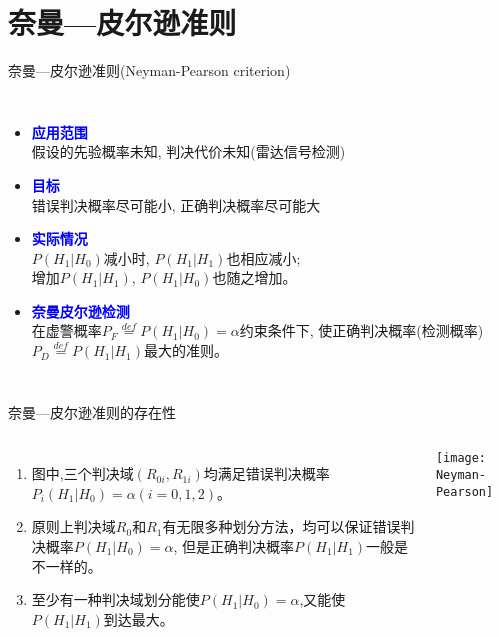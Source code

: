 \section{奈曼---皮尔逊准则}

\begin{frame}[shrink]{奈曼---皮尔逊准则(Neyman-Pearson criterion)}
\begin{columns}
\begin{itemize}
\item \textbf{\textcolor{blue}{应用范围}}\\
假设的先验概率未知, 判决代价未知(雷达信号检测)
\item \textbf{\textcolor{blue}{目标}}\\
错误判决概率尽可能小, 正确判决概率尽可能大
\item \textbf{\textcolor{blue}{实际情况}}\\
$P(H_1|H_0)$减小时, $P(H_1|H_1)$也相应减小;\\
增加$P(H_1|H_1)$, $P(H_1|H_0)$也随之增加。
\item \textbf{\textcolor{blue}{奈曼皮尔逊检测}}\\
在虚警概率$P_F\mathop{=}\limits^{def}P(H_1|H_0)=\alpha$约束条件下, 使正确判决概率(检测概率)$P_D\mathop{=}\limits^{def}P(H_1|H_1)$最大的准则。
\end{itemize}
\leftline{\texttt{[image: R0R1]}}
\end{columns}
\end{frame}

\begin{frame}{奈曼---皮尔逊准则的存在性}
\begin{columns}
\begin{enumerate}
\item 图中,三个判决域$(R_{0i},R_{1i})$均满足错误判决概率$P_i(H_1|H_0)=\alpha(i=0,1,2)$。
\item 原则上判决域$R_0$和$R_1$有无限多种划分方法，均可以保证错误判决概率$P(H_1|H_0)=\alpha$, 但是正确判决概率$P(H_1|H_1)$一般是不一样的。
\item 至少有一种判决域划分能使$P(H_1|H_0)=\alpha$,又能使$P(H_1|H_1)$到达最大。
\end{enumerate}
\texttt{[image: Neyman-Pearson]}
\end{columns}
\end{frame}

